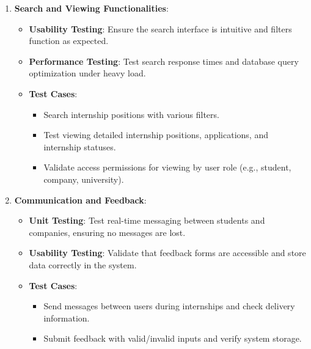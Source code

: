 \begin{enumerate}
        \item \textbf{Search and Viewing Functionalities}:
        \begin{itemize}
            \item \textbf{Usability Testing}: 
            Ensure the search interface is intuitive and filters function as expected.
            \item \textbf{Performance Testing}: 
            Test search response times and database query optimization under heavy load.
            \item \textbf{Test Cases}:
            \begin{itemize}
                \item Search internship positions with various filters.
                \item Test viewing detailed internship positions, applications, and internship statuses.
                \item Validate access permissions for viewing by user role (e.g., student, company, university).
            \end{itemize}
        \end{itemize}
    
        \item \textbf{Communication and Feedback}:
        \begin{itemize}
            \item \textbf{Unit Testing}: 
            Test real-time messaging between students and companies, ensuring no messages are lost.
            \item \textbf{Usability Testing}: 
            Validate that feedback forms are accessible and store data correctly in the system.
            \item \textbf{Test Cases}:
            \begin{itemize}
                \item Send messages between users during internships and check delivery information.
                \item Submit feedback with valid/invalid inputs and verify system storage.
            \end{itemize}
        \end{itemize}
    

\end{enumerate}
